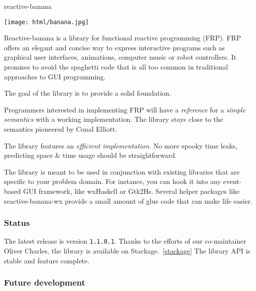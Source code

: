 \begin{hcarentry}[updated]{reactive-banana}
\makeheader

\begin{center}
\texttt{[image: html/banana.jpg]}
\end{center}

Reactive-banana is a library for functional reactive programming (FRP).  FRP
offers an elegant and concise way to express interactive programs such as
graphical user interfaces, animations, computer music or robot controllers.
It promises to avoid the spaghetti code that is all too common in traditional
approaches to GUI programming.

The goal of the library is to provide a solid foundation.

\begin{compactitem}
\item Programmers interested in implementing FRP will have a \emph{reference}
  for a \emph{simple semantics} with a working implementation. The library
  stays close to the semantics pioneered by Conal Elliott.
\item The library features an \emph{efficient implementation}. No more spooky
  time leaks, predicting space \& time usage should be straightforward.
\end{compactitem}

The library is meant to be used in conjunction with existing libraries that
are specific to your problem domain. For instance, you can hook it into any
event-based GUI framework, like wxHaskell or Gtk2Hs. Several helper packages
like reactive-banana-wx provide a small amount of glue code that can make life
easier.

\subsubsection*{Status}

The latest release is version \verb`1.1.0.1`. Thanks to
the efforts of our co-maintainer Oliver Charles, the library is available on Stackage.~\cref{stackage} The library API is stable and feature complete.

\subsubsection*{Future development}


\end{hcarentry}
